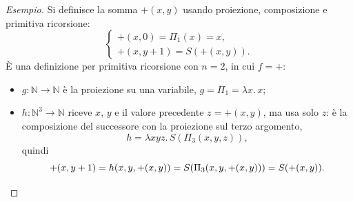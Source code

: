\documentclass[a4paper, 11pt, oneside]{book}
\theoremstyle{formale}
\newenvironment{esempio}
    {\begin{proof}[\textit{Esempio}]\renewcommand{\qedsymbol}{$\diamond$}}
    {\end{proof}}
\begin{document}
    \begin{esempio}
        Si definisce la somma ${+}(x, y)$ usando proiezione, composizione e primitiva
        ricorsione:
        \begin{equation*}
            \begin{cases}
                {+}(x, 0) = \Pi_1(x) = x, \\
                {+}(x, y + 1) = S({+}(x, y)).
            \end{cases}
        \end{equation*}
        \`E una definizione per primitiva ricorsione con $n = 2$, in cui $f = {+}$:
        \begin{itemize}
            \item $g \colon \mathbb{N} \to \mathbb{N}$ \`e la proiezione su una variabile,
                $g = \Pi_1 = \lambda x.\, x$;
            \item $h \colon \mathbb{N}^3 \to \mathbb{N}$ riceve $x$, $y$ e il valore
                precedente $z = {+}(x, y)$, ma usa solo $z$: \`e la composizione del
                successore con la proiezione sul terzo argomento,
                \begin{equation*}
                    h = \lambda x y z.\, S(\Pi_3(x, y, z)),
                \end{equation*}
                quindi
                \begin{equation*}
                    {+}(x, y + 1) = h(x, y, {+}(x, y))
                    = S(\Pi_3(x, y, {+}(x, y)))
                    = S({+}(x, y)).\qedhere
                \end{equation*}
        \end{itemize}
    \end{esempio}
\end{document}
